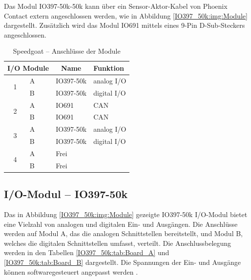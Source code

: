 Das Modul IO397-50k-50k kann über ein Sensor-Aktor-Kabel von Phoenix Contact extern angeschlossen werden, wie in Abbildung \ref{IO397_50k:img:Module} dargestellt.
Zusätzlich wird das Modul IO691 mittels eines 9-Pin D-Sub-Steckers angeschlossen.
\pagebreak[1]
\begin{table}[!ht]
	\centering
	\caption{Speedgoat – Anschlüsse der Module}
	\label{speedgoat:tab:Module}
	\begin{tabular}{clll}
		\hline
		\multicolumn{2}{c}{\textbf{I/O Module}} & \multicolumn{1}{c}{\textbf{Name}} & \textbf{Funktion}               \\ \hline
		\multirow{2}{*}{1}                      & \multicolumn{1}{l|}{A}            & IO397-50k         & analog I/O  \\
		                                        & \multicolumn{1}{l|}{B}            & IO397-50k         & digital I/O \\ \hline
		\multirow{2}{*}{2}                      & \multicolumn{1}{l|}{A}            & IO691             & CAN         \\
		                                        & \multicolumn{1}{l|}{B}            & IO691             & CAN         \\ \hline
		\multirow{2}{*}{3}                      & \multicolumn{1}{l|}{A}            & IO397-50k         & analog I/O  \\
		                                        & \multicolumn{1}{l|}{B}            & IO397-50k         & digital I/O \\ \hline
		\multirow{2}{*}{4}                      & \multicolumn{1}{l|}{A}            & Frei              &             \\
		                                        & \multicolumn{1}{l|}{B}            & Frei              &             \\ \hline
	\end{tabular}
\end{table}
\pagebreak[4]




\subsection{I/O-Modul – IO397-50k}
\label{section:IO397_50k}

Das in Abbildung \ref{IO397_50k:img:Module} gezeigte IO397-50k I/O-Modul bietet eine Vielzahl von analogen und digitalen Ein- und Ausgängen. Die Anschlüsse werden auf Modul A, das die analogen Schnittstellen bereitstellt, und Modul B, welches die digitalen Schnittstellen umfasst, verteilt. Die Anschlussbelegung werden in den Tabellen \ref{IO397_50k:tab:Board_A} und \ref{IO397_50k:tab:Board_B} dargestellt. Die Spannungen der Ein- und Ausgänge können softwaregesteuert angepasst werden \cite{speedgoat:IO397_50k}.


